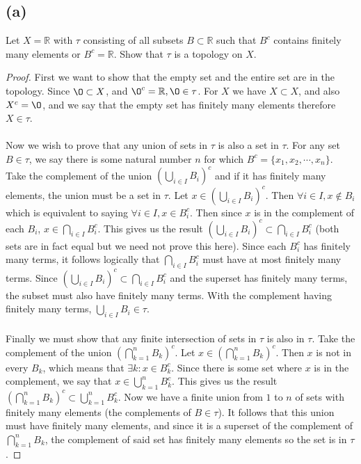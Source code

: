\documentclass{article}
\begin{document}
\subsection*{(a)}
Let $X = \mathbb{R}$ with $\tau$ consisting of all subsets $B \subset \mathbb{R}$ such that $B^c$ contains finitely many elements or $B^c = \mathbb{R}$.
Show that $\tau$ is a topology on $X$.
\begin{proof}
    First we want to show that the empty set and the entire set are in the topology.
    Since $\O \subset X$, and $\O^c = \mathbb{R}, \O \in \tau$.
    For $X$ we have $X \subset X$, and also $X^c = \O$, and we say that the empty set has finitely many elements therefore $X \in \tau$.
    \\\\
    Now we wish to prove that any union of sets in $\tau$ is also a set in $\tau$.
    For any set $B \in \tau$, we say there is some natural number $n$ for which $B^c = \{x_1, x_2, \cdots, x_n\}$.
    Take the complement of the union $\left(\bigcup_{i\in I}B_i\right)^c$ and if it has finitely many elements, the union must be a set in $\tau$.
    Let $x \in \left(\bigcup_{i\in I}B_i\right)^c$.
    Then $\forall i \in I, x \notin B_i$ which is equivalent to saying $\forall i \in I, x \in B_i^c$.
    Then since $x$ is in the complement of each $B_i$, $x \in \bigcap_{i \in I}B_i^c$.
    This gives us the result $\left(\bigcup_{i\in I}B_i\right)^c \subset \bigcap_{i \in I}B_i^c$ (both sets are in fact equal but we need not prove this here).
    Since each $B_i^c$ has finitely many terms, it follows logically that $\bigcap_{i \in I}B_i^c$ must have at most finitely many terms.
    Since $\left(\bigcup_{i\in I}B_i\right)^c \subset \bigcap_{i \in I}B_i^c$ and the superset has finitely many terms, the subset must also have finitely many terms.
    With the complement having finitely many terms, $\bigcup_{i\in I}B_i \in \tau$.
    \\\\
    Finally we must show that any finite intersection of sets in $\tau$ is also in $\tau$.
    Take the complement of the union $\left(\bigcap_{k=1}^nB_k\right)^c$.
    Let $x \in \left(\bigcap_{k=1}^nB_k\right)^c$.
    Then $x$ is not in every $B_k$, which means that $\exists k : x \in B_k^c$.
    Since there is some set where $x$ is in the complement, we say that $x \in \bigcup_{k=1}^n B_k^c$.
    This gives us the result $\left(\bigcap_{k=1}^nB_k\right)^c \subset \bigcup_{k=1}^n B_k^c$.
    Now we have a finite union from $1$ to $n$ of sets with finitely many elements (the complements of $B \in \tau$).
    It follows that this union must have finitely many elements, and since it is a superset of the complement of $\bigcap_{k=1}^nB_k$, the complement of said set has finitely many elements so the set is in $\tau$.
\end{proof}
\end{document}
